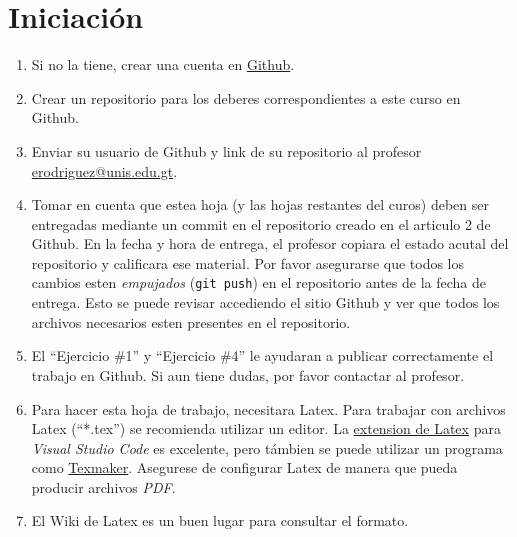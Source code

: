 \documentclass{article}
\begin{document}
    \section*{Iniciaci\'on}
    \begin{enumerate}
            \item{Si no la tiene, crear una cuenta en \href{https://github.com/}{Github}.}
            \item{Crear un repositorio\cite{GitRepo} para los deberes correspondientes a este curso en Github.}
            \item{Enviar su usuario de Github y link de su repositorio al profesor
            \href{mailto:erodriguez@unis.edu.gt}{erodriguez@unis.edu.gt}.}
            \item{Tomar en cuenta que estea hoja
            (y las hojas restantes del curos) deben ser entregadas mediante un commit
            en el repositorio creado en el articulo 2 de Github. En la fecha y hora de entrega,
            el profesor copiara el estado acutal del repositorio y calificara ese material. Por
            favor asegurarse que todos los cambios esten \emph{empujados} (\texttt{git push}) en el
            repositorio antes de la fecha de entrega. Esto se puede revisar accediendo el sitio
            Github y ver que todos los archivos necesarios esten presentes en el repositorio.}
            \item{El ``Ejercicio \#1'' y ``Ejercicio \#4'' le ayudaran a publicar correctamente
            el trabajo en Github. Si aun tiene dudas, por favor contactar al profesor.}
            \item{Para hacer esta hoja de trabajo, necesitara Latex\cite{LatexPage}. Para trabajar
            con archivos Latex (``*.tex'') se recomienda utilizar un editor. La \href{https://marketplace.visualstudio.com/items?itemName=James-Yu.latex-workshop}{extension de
            Latex} para \emph{Visual Studio Code} es excelente, pero t\'ambien se puede utilizar
            un programa como \href{http://www.xm1math.net/texmaker/}{Texmaker}. Asegurese
            de configurar Latex de manera que pueda producir archivos \emph{PDF}.}
            \item{El Wiki de Latex\cite{Latex} es un buen lugar para consultar el formato.}
    \end{enumerate}
    
\end{document}
